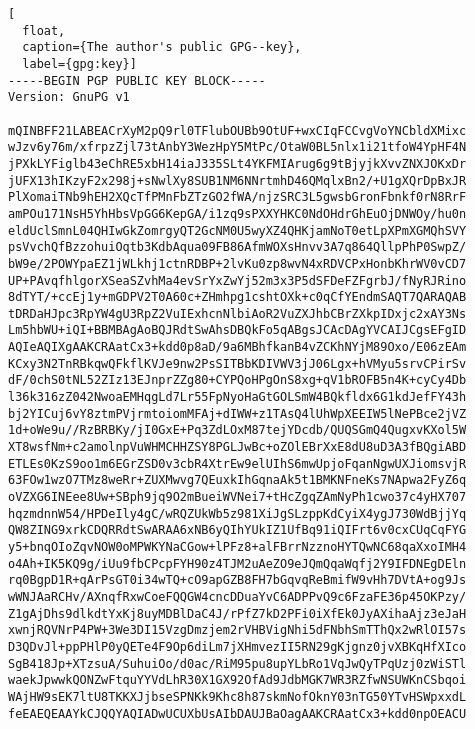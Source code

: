 \begin{lstlisting}[
  float,
  caption={The author's public GPG--key},
  label={gpg:key}]
-----BEGIN PGP PUBLIC KEY BLOCK-----
Version: GnuPG v1

mQINBFF21LABEACrXyM2pQ9rl0TFlubOUBb9OtUF+wxCIqFCCvgVoYNCbldXMixc
wJzv6y76m/xfrpzZjl73tAnbY3WezHpY5MtPc/OtaW0BL5nlx1i21tfoW4YpHF4N
jPXkLYFiglb43eChRE5xbH14iaJ335SLt4YKFMIArug6g9tBjyjkXvvZNXJOKxDr
jUFX13hIKzyF2x298j+sNwlXy8SUB1NM6NNrtmhD46QMqlxBn2/+U1gXQrDpBxJR
PlXomaiTNb9hEH2XQcTfPMnFbZTzGO2fWA/njzSRC3L5gwsbGronFbnkf0rN8RrF
amPOu171NsH5YhHbsVpGG6KepGA/i1zq9sPXXYHKC0NdOHdrGhEuOjDNWOy/hu0n
eldUclSmnL04QHIwGkZomrgyQT2GcNM0U5wyXZ4QHKjamNoT0etLpXPmXGMQhSVY
psVvchQfBzzohuiOqtb3KdbAqua09FB86AfmWOXsHnvv3A7q864QllpPhP0SwpZ/
bW9e/2POWYpaEZ1jWLkhj1ctnRDBP+2lvKu0zp8wvN4xRDVCPxHonbKhrWV0vCD7
UP+PAvqfhlgorXSeaSZvhMa4evSrYxZwYj52m3x3P5dSFDeFZFgrbJ/fNyRJRino
8dTYT/+ccEj1y+mGDPV2T0A60c+ZHmhpg1cshtOXk+c0qCfYEndmSAQT7QARAQAB
tDRDaHJpc3RpYW4gU3RpZ2VuIExhcnNlbiAoR2VuZXJhbCBrZXkpIDxjc2xAY3Ns
Lm5hbWU+iQI+BBMBAgAoBQJRdtSwAhsDBQkFo5qABgsJCAcDAgYVCAIJCgsEFgID
AQIeAQIXgAAKCRAatCx3+kdd0p8aD/9a6MBhfkanB4vZCKhNYjM89Oxo/E06zEAm
KCxy3N2TnRBkqwQFkflKVJe9nw2PsSITBbKDIVWV3jJ06Lgx+hVMyu5srvCPirSv
dF/0chS0tNL52ZIz13EJnprZZg80+CYPQoHPgOnS8xg+qV1bROFB5n4K+cyCy4Db
l36k316zZ042NwoaEMHqgLd7Lr55FpNyoHaGtGOLSmW4BQkfldx6G1kdJefFY43h
bj2YICuj6vY8ztmPVjrmtoiomMFAj+dIWW+z1TAsQ4lUhWpXEEIW5lNePBce2jVZ
1d+oWe9u//RzBRBKy/jI0GxE+Pq3ZdLOxM87tejYDcdb/QUQSGmQ4QugxvKXol5W
XT8wsfNm+c2amolnpVuWHMCHHZSY8PGLJwBc+oZOlEBrXxE8dU8uD3A3fBQgiABD
ETLEs0KzS9oo1m6EGrZSD0v3cbR4XtrEw9elUIhS6mwUpjoFqanNgwUXJiomsvjR
63FOw1wzO7TMz8weRr+ZUXMwvg7QEuxkIhGqnaAk5t1BMKNFneKs7NApwa2FyZ6q
oVZXG6INEee8Uw+SBph9jq9O2mBueiWVNei7+tHcZgqZAmNyPh1cwo37c4yHX707
hqzmdnnW54/HPDeIly4gC/wRQZUkWb5z981XiJgSLzppKdCyiX4ygJ730WdBjjYq
QW8ZING9xrkCDQRRdtSwARAA6xNB6yQIhYUkIZ1UfBq91iQIFrt6v0cxCUqCqFYG
y5+bnqOIoZqvNOW0oMPWKYNaCGow+lPFz8+alFBrrNzznoHYTQwNC68qaXxoIMH4
o4Ah+IK5KQ9g/iUu9fbCPcpFYH90z4TJM2uAeZO9eJQmQqaWqfj2Y9IFDNEgDEln
rq0BgpD1R+qArPsGT0i34wTQ+cO9apGZB8FH7bGqvqReBmifW9vHh7DVtA+og9Js
wWNJAaRCHv/AXnqfRxwCoeFQQGW4cncDDuaYvC6ADPPvQ9c6FzaFE36p45OKPzy/
Z1gAjDhs9dlkdtYxKj8uyMDBlDaC4J/rPfZ7kD2PFi0iXfEk0JyAXihaAjz3eJaH
xwnjRQVNrP4PW+3We3DI15VzgDmzjem2rVHBVigNhi5dFNbhSmTThQx2wRlOI57s
D3QDvJl+ppPHlP0yQETe4F9Op6diLm7jXHmvezII5RN29gKjgnz0jvXBKqHfXIco
SgB418Jp+XTzsuA/SuhuiOo/d0ac/RiM95pu8upYLbRo1VqJwQyTPqUzj0zWiSTl
waekJpwwkQONZwFtquYYVdLhR30X1GX92OfAd9JdbMGK7WR3RZfwNSUWKnCSbqoi
WAjHW9sEK7ltU8TKKXJjbseSPNKk9Khc8h87skmNofOknY03nTG50YTvHSWpxxdL
feEAEQEAAYkCJQQYAQIADwUCUXbUsAIbDAUJBaOagAAKCRAatCx3+kdd0npOEACU

\end{lstlisting}
